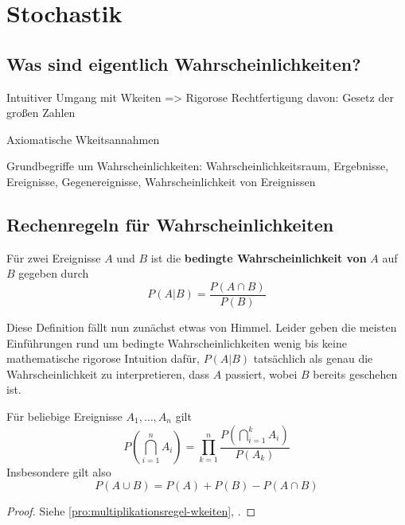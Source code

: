\chapter{Stochastik}

\section{Was sind eigentlich Wahrscheinlichkeiten?}
Intuitiver Umgang mit Wkeiten => Rigorose Rechtfertigung davon: Gesetz der großen Zahlen

Axiomatische Wkeitsannahmen 

Grundbegriffe um Wahrscheinlichkeiten: Wahrscheinlichkeitsraum, Ergebnisse, Ereignisse, Gegenereignisse, Wahrscheinlichkeit von Ereignissen

\section{Rechenregeln für Wahrscheinlichkeiten}

\begin{definition}
    Für zwei Ereignisse \(A\) und \(B\) ist die \textbf{bedingte Wahrscheinlichkeit von} \(A\) auf \(B\) gegeben durch 
    \begin{equation*}
        P(A|B) = \frac{P(A\cap B)}{P(B)}
    \end{equation*}
\end{definition}

Diese Definition fällt nun zunächst etwas von Himmel. Leider geben die meisten Einführungen rund um bedingte Wahrscheinlichkeiten wenig bis keine mathematische rigorose Intuition dafür, \(P(A|B)\) tatsächlich als genau die Wahrscheinlichkeit zu interpretieren, dass \(A\) passiert, wobei \(B\) bereits geschehen ist. 

\begin{theorem}\label{thm:multiplikationsregel-wkeiten}
    Für beliebige Ereignisse \(A_1, \dots, A_n\) gilt 
    \begin{equation*}
        P\left(\bigcap_{i=1}^n A_i\right) = \prod_{k=1}^n \frac{P\left(\bigcap_{i=1}^k A_i\right)}{P(A_k)}
    \end{equation*}
    Insbesondere gilt also
    \begin{equation}
        P(A\cup B) = P(A) + P(B) - P(A \cap B)
    \end{equation}
\end{theorem}
\begin{proof}
    Siehe \cref{pro:multiplikationsregel-wkeiten}, .
\end{proof}

